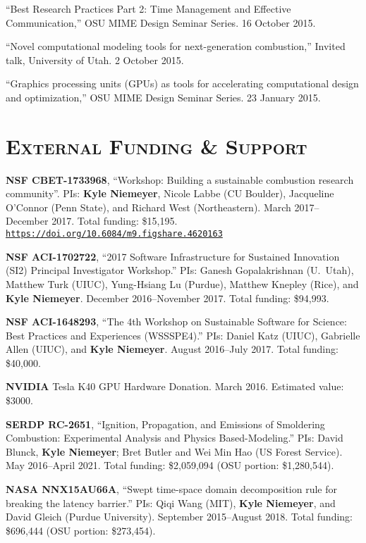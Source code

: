 \documentclass[margin,line,11pt]{res}
\makeatletter
\newlength{\bibhang}
\newlength{\bibsep}
 {\@listi \global\bibsep\itemsep \global\advance\bibsep by\parsep}
\newenvironment{bibenum*}
  {\renewcommand\labelenumi{\theenumi.}%
   \etaremune[
     topsep=0pt,
     itemsep=\bibsep,
     parsep=0pt,partopsep=0pt,
     itemindent=-\bibhang,
     leftmargin={\bibhang+\widthof{[999]}}]}
  {\endetaremune}
\newcommand*{\doi}[1]{\href{https://doi.org/#1}{\nolinkurl{https://doi.org/#1}}}
\makeatother
\begin{document}
\begin{resume}
\begin{bibenum*}
\item ``Best Research Practices Part 2: Time Management and Effective Communication,''
OSU MIME Design Seminar Series. 16 October 2015.

\item ``Novel computational modeling tools for next-generation combustion,''
Invited talk, University of Utah. 2 October 2015.

\item ``Graphics processing units (GPUs) as tools for accelerating computational design and optimization,''
OSU MIME Design Seminar Series. 23 January 2015.

\end{bibenum*}

\section{\textsc{External Funding \& Support}}

\textbf{NSF CBET-1733968}, ``Workshop: Building a sustainable combustion research community''.
PIs: \textbf{Kyle Niemeyer}, Nicole Labbe (CU Boulder), Jacqueline O'Connor (Penn State), and Richard West (Northeastern).
March 2017--December 2017.
Total funding: \$15,195. \\
\doi{10.6084/m9.figshare.4620163}

\textbf{NSF ACI-1702722}, ``2017 Software Infrastructure for Sustained Innovation (SI2) Principal Investigator Workshop.''
PIs: Ganesh Gopalakrishnan (U.~Utah), Matthew Turk (UIUC), Yung-Hsiang Lu (Purdue), Matthew Knepley (Rice), and \textbf{Kyle Niemeyer}.
December 2016--November 2017.
Total funding: \$94,993.

\textbf{NSF ACI-1648293}, ``The 4th Workshop on Sustainable Software for Science: Best Practices and Experiences (WSSSPE4).''
PIs: Daniel Katz (UIUC), Gabrielle Allen (UIUC), and \textbf{Kyle Niemeyer}.
August 2016--July 2017.
Total funding: \$40,000.

\textbf{NVIDIA} Tesla K40 GPU Hardware Donation. March 2016. Estimated value: \$3000.

\textbf{SERDP RC-2651}, ``Ignition, Propagation, and Emissions of Smoldering Combustion: Experimental Analysis and Physics Based-Modeling.'' PIs: David Blunck, \textbf{Kyle Niemeyer}; Bret Butler and Wei Min Hao (US Forest Service). May 2016--April 2021. Total funding: \$2,059,094 (OSU portion: \$1,280,544).

\textbf{NASA NNX15AU66A}, ``Swept time-space domain decomposition rule for breaking the latency barrier.'' PIs: Qiqi Wang (MIT), \textbf{Kyle Niemeyer}, and David Gleich (Purdue University). September 2015--August 2018. Total funding: \$696,444 (OSU portion: \$273,454).


\end{resume}
\end{document}
